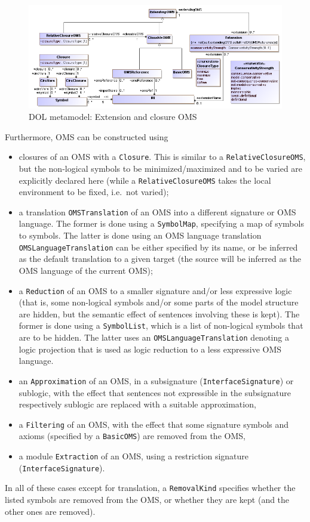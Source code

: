 \documentclass[10pt, a4paper]{isov2}
\newcommand*{\termref}[1]{\index{#1}#1\xspace}
\newcommand*{\syntax}[1]{\texttt{#1}}
\begin{document}
\medskip
\begin{figure}
  \centering
    \includegraphics[scale=0.47]{mof/extension&closure.png}
  \caption{DOL metamodel: Extension and closure OMS}
  \label{fig:extension&closure}
\end{figure}


Furthermore, OMS can be constructed using 
\begin{itemize}
\item  closures of an OMS with a \syntax{Closure}.  This is
  similar to a \syntax{RelativeClosureOMS}, but the non-logical
  symbols to be  minimized/maximized and to be varied are
  explicitly declared here (while a \syntax{RelativeClosureOMS} takes
  the local environment to be fixed, i.e.\ not varied);
\item a translation \syntax{OMSTranslation} of an OMS into a different
  signature or OMS language. The former is done using a \syntax{SymbolMap},
  specifying a map of symbols to symbols. The latter is done using an 
  OMS language
  translation \syntax{OMSLanguageTranslation} can be either specified
  by its name, or be inferred as the \termref{default translation} to
  a given target (the source will be inferred as the OMS language of
  the current OMS);
\item a \syntax{Reduction} of an OMS to a smaller signature and/or
  less expressive logic (that is, some non-logical symbols and/or some
  parts of the model structure are hidden, but the semantic effect of
  sentences involving these is kept). The former is done using a
  \syntax{SymbolList}, which is a list of non-logical symbols that are
  to be hidden. The latter uses an \syntax{OMSLanguageTranslation}
  denoting a logic projection that is used as logic reduction to a
  less expressive OMS language.
\item an \syntax{Approximation} of an OMS, in a subsignature (\syntax{InterfaceSignature}) or sublogic, with the effect that sentences not expressible in the subsignature respectively sublogic are replaced with a suitable approximation,
\item a \syntax{Filtering} of an OMS, with the effect that some signature symbols and axioms (specified by a \syntax{BasicOMS}) are removed from the OMS,
\item a module \syntax{Extraction} of an OMS, using a restriction signature (\syntax{InterfaceSignature}).
\end{itemize}
In all of these cases except for translation, a \syntax{RemovalKind}
specifies whether the listed symbols are removed from the OMS, or
whether they are kept (and the other ones are removed).
\end{document}
